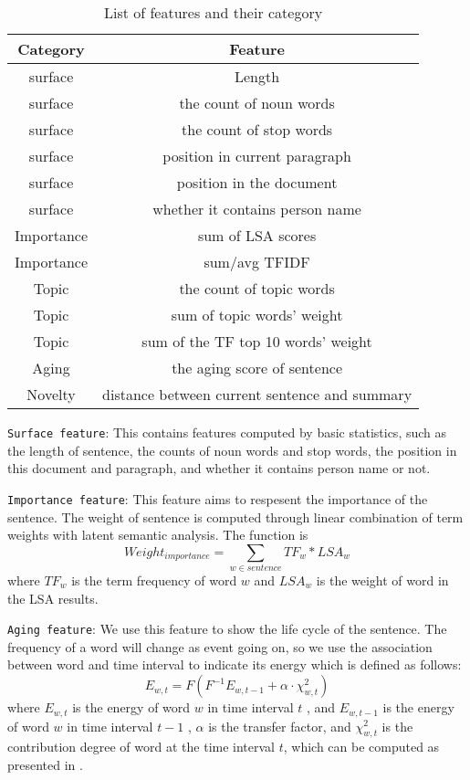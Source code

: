 \documentclass{acm_proc_article-sp}
\begin{document}
\begin{table}
\centering
\caption{List of features and their category}
\begin{tabular}{c|c}
\hline
Category & Feature\\
\hline
surface & Length\\
surface & the count of noun words\\
surface & the count of stop words\\
surface & position in current paragraph\\
surface & position in the document\\
surface & whether it contains person name\\
\hline
Importance & sum of LSA scores\\
Importance & sum/avg TFIDF\\
\hline
Topic & the count of topic words\\
Topic & sum of topic words' weight\\
Topic & sum of the TF top 10 words' weight  \\
\hline
Aging & the aging score of sentence\\
\hline 
Novelty & distance between current sentence and summary\\
\hline
 
\end{tabular}
\end{table}

\texttt{Surface feature}: This contains features computed by basic statistics, such as the length of sentence, the counts of noun words and stop words, the position in this document and paragraph, and whether it contains person name or not. %

\texttt{Importance feature}: This feature aims to respesent the importance of the sentence. The weight of sentence is computed through linear combination of term weights with latent semantic analysis. The function is 
\begin{equation}
Weight_{importance} = \sum_{w \in sentence}TF_w * LSA_w
\end{equation}
where $TF_w$ is the term frequency of word $w$ and $LSA_w$ is the weight of word in the LSA results.

\texttt{Aging feature}: We use this feature to show the life cycle of the sentence. The frequency of a word will change as event going on, so we use the association between word  and time interval  to indicate its energy which is defined as follows:
\begin{equation}
  E_{w,t} =F(F^{-1}E_{w,t-1}+\alpha\cdot\chi^2_{w,t})
\end{equation}
where $E_{w,t}$ is the energy of word $w$  in time interval $t$ , and $E_{w,t-1}$  is the energy of word $w$ in time interval $t-1$ , $\alpha$ is the transfer factor, and $\chi^2_{w,t}$  is the contribution degree of word  at the time interval $t$, which can be computed as presented in \cite{2000-Swan-p49-56}. 
\end{document}
